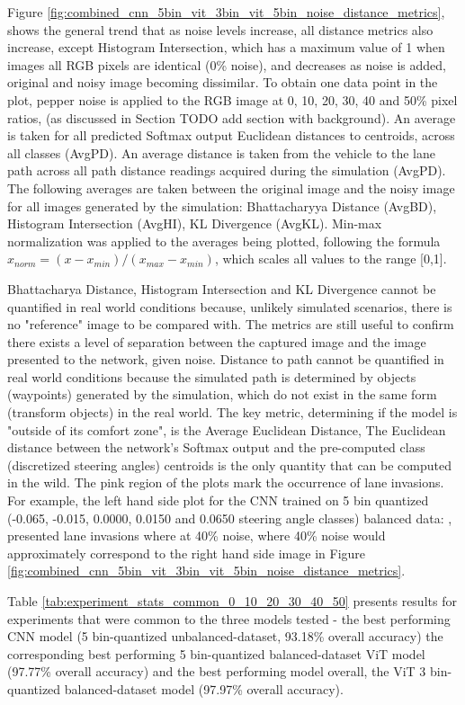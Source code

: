 Figure \ref{fig:combined_cnn_5bin_vit_3bin_vit_5bin_noise_distance_metrics}, shows the general trend that as noise levels increase, all distance metrics also increase, except Histogram Intersection, which has a maximum value of 1 when images all RGB pixels are identical (0\% noise), and decreases as noise is added, original and noisy image becoming dissimilar.
To obtain one data point in the plot, pepper noise is applied to the RGB image at 0, 10, 20, 30, 40 and 50\% pixel ratios, (as discussed in Section TODO add section with background). An average is taken for all predicted Softmax output Euclidean distances to centroids, across all classes (AvgPD). An average distance is taken from the vehicle to the lane path across all path distance readings acquired during the simulation (AvgPD). The following averages are taken between the original image and the noisy image for all images generated by the simulation: Bhattacharyya Distance (AvgBD), Histogram Intersection (AvgHI), KL Divergence (AvgKL). Min-max normalization was applied to the averages being plotted, following the formula $x_{norm} = (x - x_{min}) / (x_{max} - x_{min})$, which scales all values to the range [0,1].

Bhattacharya Distance, Histogram Intersection and KL Divergence cannot be quantified in real world conditions because, unlikely simulated scenarios, there is no "reference" image to be compared with. The metrics are still useful to confirm there exists a level of separation between the captured image and the image presented to the network, given noise. Distance to path cannot be quantified in real world conditions because the simulated path is determined by objects (waypoints) generated by the simulation, which do not exist in the same form (transform objects) in the real world. The key metric, determining if the model is "outside of its comfort zone", is the Average Euclidean Distance, The Euclidean distance between the network's Softmax output and the pre-computed class (discretized steering angles) centroids is the only quantity that can be computed in the wild.
The pink region of the plots mark the occurrence of lane invasions. For example, the left hand side plot for the CNN trained on 5 bin quantized (-0.065, -0.015, 0.0000, 0.0150 and 0.0650 steering angle classes) balanced data: , presented lane invasions where at 40\% noise, where 40\% noise would approximately correspond to the right hand side image in Figure \ref{fig:combined_cnn_5bin_vit_3bin_vit_5bin_noise_distance_metrics}. 

Table \ref{tab:experiment_stats_common_0_10_20_30_40_50} presents results for experiments that were common to the three models tested - the best performing CNN model (5 bin-quantized unbalanced-dataset, 93.18\% overall accuracy) the corresponding best performing 5 bin-quantized balanced-dataset ViT model (97.77\% overall accuracy) and the best performing model overall, the ViT 3 bin-quantized balanced-dataset model (97.97\% overall accuracy).

